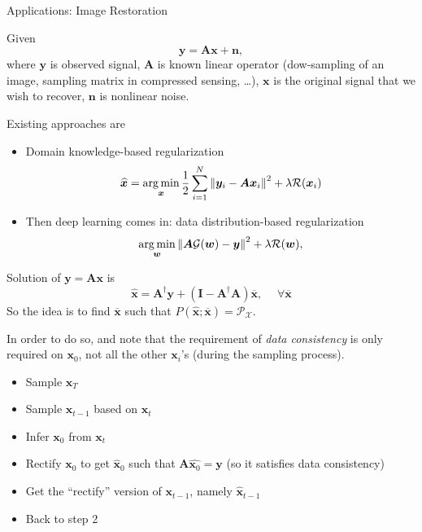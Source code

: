 \documentclass[10pt,xcolor={usenames,dvipsnames,table},aspectratio=169]{beamer}
\begin{document}
\begin{frame}{Applications: Image Restoration}

Given 
\[
\bm{y} = \bm{A} \bm{x} + \bm{n},
\] 
where $\bm{y}$ is observed signal, $\bm{A}$ is known linear operator (dow-sampling of an image, sampling matrix in compressed sensing, \ldots ), $\bm{x}$ is the original signal that we wish to recover, $\bm{n}$ is nonlinear noise.

Existing approaches are
\begin{itemize}
\item Domain knowledge-based regularization
        \[
\widehat{\bm{x}} = \operatorname*{arg\,min}_{\bm{x}} \dfrac{1}{2} \sum^{N}_{i=1} \left\lVert\bm{y}_i - \bm{A}\bm{x}_i\right\rVert^2 + \lambda \mathcal{R}(\bm{x}_i)
\] 
\item Then deep learning comes in: data distribution-based regularization
\[
\operatorname*{arg\,min}_{\bm{w}} \left\lVert\bm{A} \mathcal{G}(\bm{w}) - \bm{y}\right\rVert^2 + \lambda \mathcal{R}(\bm{w}),
\] 
\end{itemize}
\end{frame}
\begin{frame}
Solution of $\bm{y} = \bm{A}\bm{x}$ is
\[
    \widehat{\bm{x}} = \bm{A}^{\dagger} \bm{y} + (\bm{I} - \bm{A}^{\dagger} \bm{A}) \overline{\bm{x}}, \quad \; \forall  \overline{\bm{x}}
\] 
So the idea is to find $\overline{\bm{x}}$ such that $P(\widehat{\bm{x}}; \overline{\bm{x}}) = \mathcal{P}_{\mathcal{X}}$.

In order to do so, and note that the requirement of \textit{data consistency} is only required on $\bm{x}_0$, not all the other $\bm{x}_i$'s (during the sampling process).
\begin{itemize}
    \item Sample $\bm{x}_T$
    \item Sample $\bm{x}_{t-1}$ based on $\bm{x}_t$
    \item Infer $\bm{x}_0$ from $\bm{x}_t$
    \item Rectify $\bm{x}_0$ to get $\widehat{\bm{x}}_0$ such that $\bm{A} \widehat{\bm{x}_0} = \bm{y}$ (so it satisfies data consistency)
    \item Get the ``rectify'' version of $\bm{x}_{t-1}$, namely $\widehat{\bm{x}}_{t-1}$
    \item Back to step 2
\end{itemize}
\end{frame}
\end{document}
